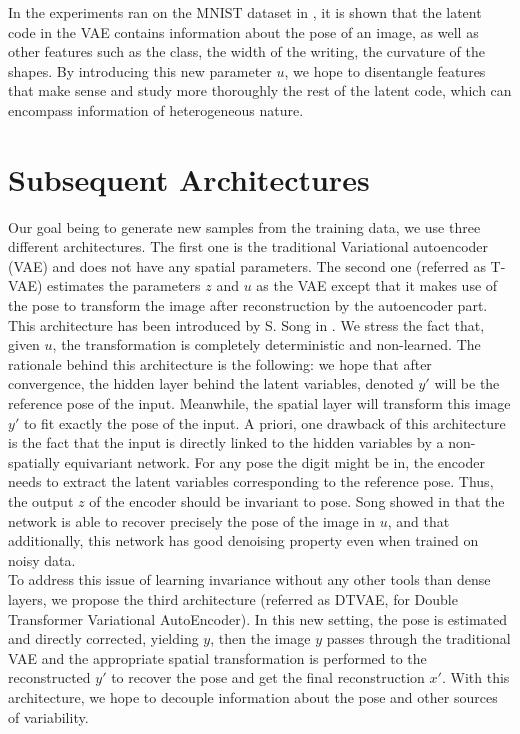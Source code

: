 \documentclass[letterpaper, twoside]{article}
\begin{document}
    In the experiments ran on the MNIST dataset \cite{mnistlecun} in \cite{Kingma.aevb}, it is shown that the latent code in the VAE contains information about the pose of an image, as well as other features such as the class, the width of the writing, the curvature of the shapes. By introducing this new parameter $u$, we hope to disentangle features that make sense and study more thoroughly the rest of the latent code, which can encompass information of heterogeneous nature.

\section{Subsequent Architectures}

Our goal being to generate new samples from the training data, we use three different architectures. The first one is the traditional Variational autoencoder (VAE) and does not have any spatial parameters. The second one (referred as T-VAE) estimates the parameters $z$ and $u$ as the VAE except that it makes use of the pose to transform the image after reconstruction by the autoencoder part. This architecture has been introduced by S. Song in \cite{Siyu:vae}. We stress the fact that, given $u$, the transformation is completely deterministic and non-learned. The rationale behind this architecture is the following: we hope that after convergence, the hidden layer behind the latent variables, denoted $y'$ will be the reference pose of the input. Meanwhile, the spatial layer will transform this image $y'$ to fit exactly the pose of the input. A priori, one drawback of this architecture is the fact that the input is directly linked to the hidden variables by a non-spatially equivariant network. For any pose the digit might be in, the encoder needs to extract the latent variables corresponding to the reference pose. Thus, the output $z$ of the encoder should be invariant to pose. Song showed in \cite{Siyu:vae} that the network is able to recover precisely the pose of the image in $u$, and that additionally, this network has good denoising property even when trained on noisy data.\\
To address this issue of learning invariance without any other tools than dense layers, we propose the third architecture (referred as DTVAE, for Double Transformer Variational AutoEncoder). In this new setting, the pose is estimated and directly corrected, yielding $y$, then the image $y$ passes through the traditional VAE and the appropriate spatial transformation is performed to the reconstructed $y'$ to recover the pose and get the final reconstruction $x'$. With this architecture, we hope to decouple information about the pose and other sources of variability.\\
\end{document}
